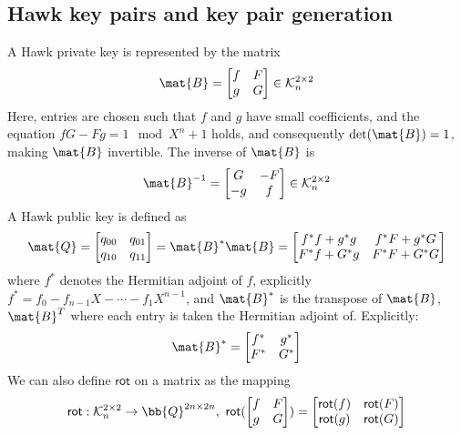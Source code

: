 \subsection{Hawk key pairs and key pair generation}
A Hawk private key is represented by the matrix
\[ \mat{B} = 
    \begin{bmatrix} 
        f & F \\
        g & G
    \end{bmatrix}
    \in \mathcal{K}_{n}^{2 \times 2}
\]
Here, entries are chosen such that $f$ and $g$ have small coefficients, and the equation $fG - Fg = 1 \mod X^{n} + 1$ holds, and consequently $\det(\mat{B}) = 1$, making $\mat{B}$ invertible.
The inverse of $\mat{B}$ is 
\[
    \mat{B}^{-1} =
    \begin{bmatrix}
        G & -F \\
        -g & f
    \end{bmatrix}
    \in \mathcal{K}_{n}^{2 \times 2}
\]
A Hawk public key is defined as 
\[
    \mat{Q} = 
    \begin{bmatrix}
        q_{00} & q_{01} \\
        q_{10} & q_{11}
    \end{bmatrix}
    =
    \mat{B}^* \mat{B}
    =
    \begin{bmatrix}
        f^* f + g^*g & f^* F + g^*G \\
        F^* f + G^*g & F^*F + G^*G
    \end{bmatrix}
\]
where $f^*$ denotes the Hermitian adjoint of $f$, explicitly $f^* = f_0 - f_{n-1}X - \cdots - f_{1}X^{n-1}$,
and $\mat{B}^*$ is the transpose of $\mat{B}$, $\mat{B}^T$ where each entry is taken the Hermitian adjoint of. Explicitly:
\[
    \mat{B}^* = 
    \begin{bmatrix}
        f^* & g^* \\
        F^* & G^*
    \end{bmatrix}
\]
We can also define $\mathsf{rot}$ on a matrix as the mapping 
\[\mathsf{rot}: \mathcal{K}_n^{2 \times 2} \rightarrow \bb{Q}^{2n \times 2n}, \ 
    \mathsf{rot}(
    \begin{bmatrix}
        f & F \\
        g & G
    \end{bmatrix}
    )
    =
    \begin{bmatrix}
        \mathsf{rot}(f) & \mathsf{rot}(F) \\
        \mathsf{rot}(g) & \mathsf{rot}(G)
    \end{bmatrix}
\]

